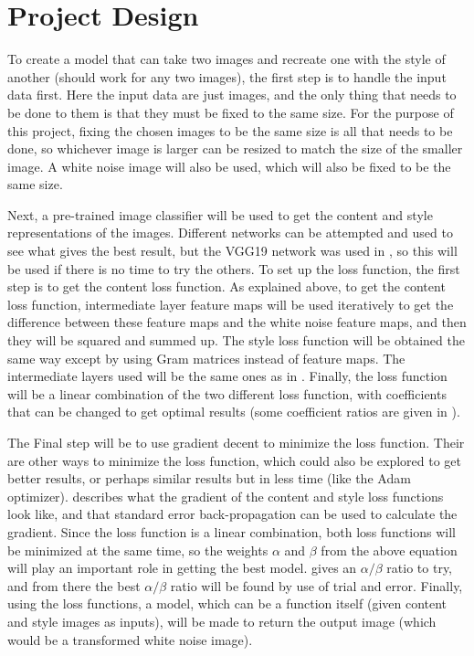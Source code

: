 \documentclass[9pt]{article}
\begin{document}
\section{Project Design}
To create a model that can take two images and recreate one with the style of another (should work for any two images), the first step is to handle the input data first. Here the input data are just images, and the only thing that needs to be done to them is that they must be fixed to the same size. For the purpose of this project, fixing the chosen images to be the same size is all that needs to be done, so whichever image is larger can be resized to match the size of the smaller image. A white noise image will also be used, which will also be fixed to be the same size. 

Next, a pre-trained image classifier will be used to get the content and style representations of the images. Different networks can be attempted and used to see what gives the best result, but the VGG19 network was used in \cite{Neural, Image}, so this will be used if there is no time to try the others. To set up the loss function, the first step is to get the content loss function. As explained above, to get the content loss function, intermediate layer feature maps will be used iteratively to get the difference between these feature maps and the white noise feature maps, and then they will be squared and summed up. The style loss function will be obtained the same way except by using Gram matrices instead of feature maps. The intermediate layers used will be the same ones as in \cite{Neural}. Finally, the loss function will be a linear combination of the two different loss function, with coefficients that can be changed to get optimal results (some coefficient ratios are given in \cite{Neural, Image}). 

The Final step will be to use gradient decent to minimize the loss function. Their are other ways to minimize the loss function, which could also be explored to get better results, or perhaps similar results but in less time (like the Adam optimizer). \cite{Neural} describes what the gradient of the content and style loss functions look like, and that standard error back-propagation can be used to calculate the gradient. Since the loss function is a linear combination, both loss functions will be minimized at the same time, so the weights $\alpha$ and $\beta$ from the above equation will play an important role in getting the best model. \cite{Neural} gives an $\alpha/\beta$ ratio to try, and from there the best $\alpha/\beta$ ratio will be found by use of trial and error. Finally, using the loss functions, a model, which can be a function itself (given content and style images as inputs), will be made to return the output image (which would be a transformed white noise image).

\newpage



\end{document}
